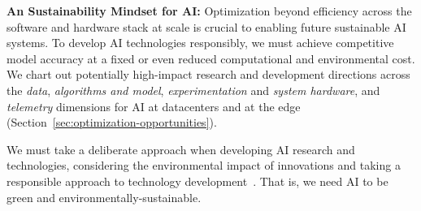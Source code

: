 \textbf{An Sustainability Mindset for AI:} Optimization beyond efficiency across the software and hardware stack at scale is crucial to enabling future sustainable AI systems.
To develop AI technologies responsibly, we must achieve competitive model accuracy at a fixed or even reduced computational and environmental cost. We chart out potentially high-impact research and development directions across the \textit{data}, \textit{algorithms and model}, \textit{experimentation} and \textit{system hardware}, and \textit{telemetry} dimensions for AI at datacenters and at the edge (Section~\ref{sec:optimization-opportunities}). 

We must take a deliberate approach when developing AI research and technologies, considering the environmental impact of innovations and taking a responsible approach to technology development~\cite{wu:arxiv:2021}. That is, we need AI to be green and environmentally-sustainable.

